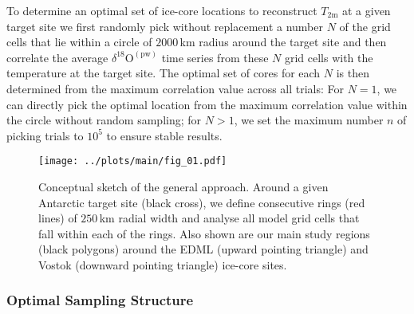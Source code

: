 \documentclass[draft]{agujournal2019}
\begin{document}
To determine an optimal set of ice-core locations to reconstruct
$T_{2\mathrm{m}}$ at a given target site we first randomly pick without
replacement a number $N$ of the grid cells that lie within a circle of
$2000$\,km radius around the target site and then correlate the average
$\delta^{18}\mathrm{O}^{\mathrm{(pw)}}$ time series from these $N$ grid cells
with the temperature at the target site. The optimal set of cores for each $N$
is then determined from the maximum correlation value across all trials: For
$N=1$, we can directly pick the optimal location from the maximum correlation
value within the circle without random sampling; for $N>1$, we set the maximum
number $n$ of picking trials to $10^5$ to ensure stable results.

\begin{figure}[t]%
\centering
\texttt{[image: ../plots/main/fig\_01.pdf]}
\caption[Conceptual approach]{%
  Conceptual sketch of the general approach. Around a given Antarctic target
  site (black cross), we define consecutive rings (red lines) of $250$\,km
  radial width and analyse all model grid cells that fall within each of the
  rings. Also shown are our main study regions (black polygons) around the EDML
  (upward pointing triangle) and Vostok (downward pointing triangle) ice-core
  sites.}
\label{fig:concept}%
\end{figure}%

\subsubsection{Optimal Sampling Structure}\label{methods:opt.sampling}
\end{document}

